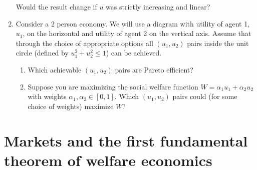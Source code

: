 \documentclass[a4paper,12pt]{article}
\begin{document}
\begin{enumerate}
  Would the result change if $u$ was strictly increasing and linear?
\item Consider a 2 person economy. We will use a diagram with utility of agent 1, $u_1$, on the horizontal and utility of agent 2 on the vertical axis. Assume that through the choice of appropriate options all $(u_1,u_2)$ pairs inside the unit circle (defined by $u_1^2+u_2^2\leq 1$) can be achieved.
  \begin{enumerate}
  \item Which achievable $(u_1,u_2)$ pairs are Pareto efficient?
  \item Suppose you are maximizing the social welfare function $W=\alpha_1u_1+\alpha_2u_2$ with weights $\alpha_1,\alpha_2\in[0,1]$. Which $(u_1,u_2)$ pairs could (for some choice of weights) maximize $W$?
    \end{enumerate}
    
\end{enumerate}

\section{Markets and the first fundamental theorem of welfare economics}
\label{sec:mark-first-fund}
\end{document}
